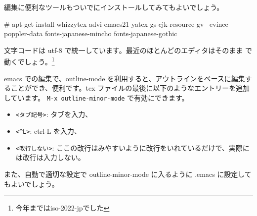 \documentclass[mingoth,a4paper]{jsarticle}
\begin{document}
編集に便利なツールもついでにインストールしてみてもよいでしょう。

\begin{commandline}
# apt-get install whizzytex advi emacs21 yatex gs-cjk-resource gv \
  evince poppler-data fonts-japanese-mincho fonts-japanese-gothic
\end{commandline}


文字コードは utf-8 で統一しています。最近のほとんどのエディタはそのまま
で動くでしょう。\footnote{今年まではiso-2022-jpでした}

emacs での編集で、outline-mode を利用すると、アウトラインをベースに編集す
ることができ、便利です。tex ファイルの最後に以下のようなエントリーを追加
しています。
\texttt{M-x outline-minor-mode} で有効にできます。

\begin{commandline}
;;; Local Variables: ***
;;; outline-regexp: "\\([ <タブ記号>]*\\\\\\(documentstyle\\|documentclass\\|<改行しない>
dancersection\\)\\*?[ <タブ記号>]*[[{]\\|[%
;;; End: ***
\end{commandline}

\begin{itemize}
 \item 
 \verb!<タブ記号>!: タブを入力、
 \item  \verb!<^L>!: ctrl-L を入力、
 \item  \verb!<改行しない>!: ここの改行はみやすいように改行をいれているだけで、実際には改行は入力しない。
\end{itemize}

また、自動で適切な設定で outline-minor-mode に入るように .emacs に設定してもよいでしょう。
\end{document}
